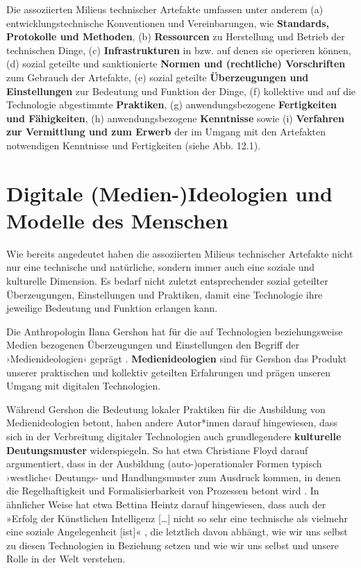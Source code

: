\documentclass[
  a4paper,
]{book}
\begin{document}
Die assoziierten Milieus technischer Artefakte umfassen unter anderem (a) entwicklungstechnische Konventionen und Vereinbarungen, wie \textbf{Standards, Protokolle und Methoden}, (b) \textbf{Ressourcen} zu Herstellung und Betrieb der technischen Dinge, (c) \textbf{Infrastrukturen} in bzw. auf denen sie operieren können, (d) sozial geteilte und sanktionierte \textbf{Normen und (rechtliche) Vorschriften} zum Gebrauch der Artefakte, (e) sozial geteilte \textbf{Überzeugungen und Einstellungen} zur Bedeutung und Funktion der Dinge, (f) kollektive und auf die Technologie abgestimmte \textbf{Praktiken}, (g) anwendungsbezogene \textbf{Fertigkeiten und Fähigkeiten}, (h) anwendungsbezogene \textbf{Kenntnisse} sowie (i) \textbf{Verfahren zur Vermittlung und zum Erwerb} der im Umgang mit den Artefakten notwendigen Kenntnisse und Fertigkeiten (siehe {Abb. 12.1}).

\section{Digitale (Medien-)Ideologien und Modelle des Menschen}\label{digitale-medien-ideologien-und-modelle-des-menschen}

Wie bereits angedeutet haben die assoziierten Milieus technischer Artefakte nicht nur eine technische und natürliche, sondern immer auch eine soziale und kulturelle Dimension. Es bedarf nicht zuletzt entsprechender sozial geteilter Überzeugungen, Einstellungen und Praktiken, damit eine Technologie ihre jeweilige Bedeutung und Funktion erlangen kann.

Die Anthropologin Ilana Gershon hat für die auf Technologien beziehungsweise Medien bezogenen Überzeugungen und Einstellungen den Begriff der ›Medienideologien‹ geprägt \citep[vgl.][]{gershonMediaIdeologiesIntroduction2010}. \textbf{Medienideologien} sind für Gershon das Produkt unserer praktischen und kollektiv geteilten Erfahrungen und prägen unseren Umgang mit digitalen Technologien.

Während Gershon die Bedeutung lokaler Praktiken für die Ausbildung von Medienideologien betont, haben andere Autor*innen darauf hingewiesen, dass sich in der Verbreitung digitaler Technologien auch grundlegendere \textbf{kulturelle Deutungsmuster} widerspiegeln. So hat etwa Christiane Floyd darauf argumentiert, dass in der Ausbildung (auto-)operationaler Formen typisch ›westliche‹ Deutungs- und Handlungsmuster zum Ausdruck kommen, in denen die Regelhaftigkeit und Formalisierbarkeit von Prozessen betont wird \citep[vgl.][]{floydDevelopingEmbeddingAutoOperational2002}. In ähnlicher Weise hat etwa Bettina Heintz darauf hingewiesen, dass auch der »Erfolg der Künstlichen Intelligenz {[}\ldots{]} nicht so sehr eine technische als vielmehr eine soziale Angelegenheit {[}ist{]}« \citep[vgl.][S. 289]{heintzHerrschaftRegelZur1993}, die letztlich davon abhängt, wie wir uns selbst zu diesen Technologien in Beziehung setzen und wie wir uns selbst und unsere Rolle in der Welt verstehen.
\end{document}
